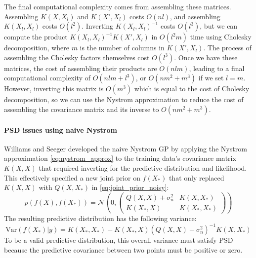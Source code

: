 The final computational complexity comes from assembling these matrices. Assembling $K(X, X_l)$ and $K(X', X_l)$ costs $O(nl)$, and assembling $K(X_l, X_l)$ costs $O(l^2)$. Inverting $K(X_l, X_l)^{-1}$ costs $O(l^3)$, but we can compute the product $K(X_l, X_l)^{-1} K(X', X_l)$ in $O(l^2m)$ time using Cholesky decomposition, where $m$ is the number of columns in $K(X', X_l)$. The process of assembling the Cholesky factors themselves cost $O(l^3)$. Once we have these matrices, the cost of assembling their products are $O(nlm)$, leading to a final computational complexity of $O(nlm + l^3)$, or $O(nm^2 + m^3)$ if we set $l = m$. However, inverting this matrix is $O(m^3)$ which is equal to the cost of Cholesky decomposition, so we can use the Nystrom approximation to reduce the cost of assembling the covariance matrix and its inverse to $O(nm^2 + m^3)$.

\paragraph{PSD issues using naive Nystrom}
Williams and Seeger \cite{naive-nystrom} developed the naive Nystrom GP by applying the Nystrom approximation \ref{eq:nystrom_approx} to the training data's covariance matrix $K(X, X)$ that required inverting for the predictive distribution and likelihood. This effectively specified a new joint prior on $f(X_*)$ that only replaced $K(X, X)$ with $Q(X, X_*)$ in \ref{eq:joint_prior_noisy}:
\begin{equation*}
    p(f(X), f(X_*)) = \mathcal{N} \left( 0, 
    \begin{pmatrix}
        Q(X, X) + \sigma_n^2 & K(X, X_*) \\
        K(X_*, X) & K(X_*, X_*)
    \end{pmatrix}
    \right)
\end{equation*}
The resulting predictive distribution has the following variance:
\begin{equation*}
    \text{Var}(f(X_*) | y) = K(X_*, X_*) - K(X_*, X) (Q(X, X) + \sigma_n^2)^{-1} K(X, X_*)
\end{equation*}
To be a valid predictive distribution, this overall variance must satisfy PSD because the predictive covariance between two points must be positive or zero. 

